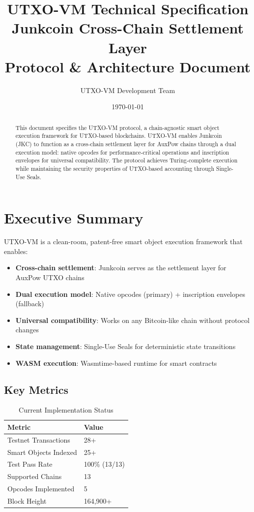 \documentclass[a4paper,11pt]{article}
\title{\textbf{UTXO-VM Technical Specification}\\
\large Junkcoin Cross-Chain Settlement Layer\\
\large Protocol \& Architecture Document}
\author{UTXO-VM Development Team}
\date{\today}
\begin{document}
\maketitle

\begin{abstract}
This document specifies the UTXO-VM protocol, a chain-agnostic smart object execution framework for UTXO-based blockchains. UTXO-VM enables Junkcoin (JKC) to function as a cross-chain settlement layer for AuxPow chains through a dual execution model: native opcodes for performance-critical operations and inscription envelopes for universal compatibility. The protocol achieves Turing-complete execution while maintaining the security properties of UTXO-based accounting through Single-Use Seals.
\end{abstract}

\tableofcontents

\newpage

\section{Executive Summary}

UTXO-VM is a clean-room, patent-free smart object execution framework that enables:

\begin{itemize}
    \item \textbf{Cross-chain settlement}: Junkcoin serves as the settlement layer for AuxPow UTXO chains
    \item \textbf{Dual execution model}: Native opcodes (primary) + inscription envelopes (fallback)
    \item \textbf{Universal compatibility}: Works on any Bitcoin-like chain without protocol changes
    \item \textbf{State management}: Single-Use Seals for deterministic state transitions
    \item \textbf{WASM execution}: Wasmtime-based runtime for smart contracts
\end{itemize}

\subsection{Key Metrics}
\begin{table}[h]
\centering
\begin{tabular}{@{}ll@{}}
\toprule
\textbf{Metric} & \textbf{Value} \\
\midrule
Testnet Transactions & 28+ \\
Smart Objects Indexed & 25+ \\
Test Pass Rate & 100\% (13/13) \\
Supported Chains & 13 \\
Opcodes Implemented & 5 \\
Block Height & 164,900+ \\
\bottomrule
\end{tabular}
\caption{Current Implementation Status}
\end{table}
\end{document}
